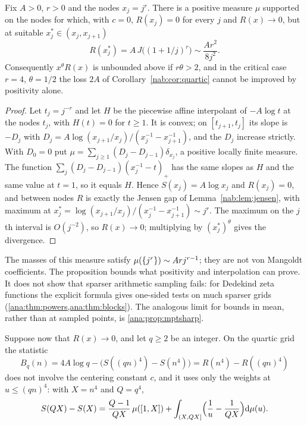 \begin{proposition}\label{nab:prop:samplingsharp}
Fix $A>0$, $r>0$ and the nodes $x_j=j^r$. There is a positive measure $\mu$ supported on
the nodes for which, with $c=0$, $R(x_j)=0$ for every $j$ and $R(x)\to0$, but at suitable
$x_j^*\in(x_j,x_{j+1})$
\[
 R(x_j^*)=A\,J\bigl((1+1/j)^r\bigr)\sim\frac{Ar^2}{8j^2}.
\]
Consequently $x^\theta R(x)$ is unbounded above if $r\theta>2$, and in the critical case
$r=4$, $\theta=1/2$ the loss $2A$ of Corollary~\ref{nab:cor:quartic} cannot be improved by
positivity alone.
\end{proposition}
\begin{proof}
Let $t_j=j^{-r}$ and let $H$ be the piecewise affine interpolant of $-A\log t$ at the nodes
$t_j$, with $H(t)=0$ for $t\ge1$. It is convex; on $[t_{j+1},t_j]$ its slope is $-D_j$ with
$D_j=A\log(x_{j+1}/x_j)/(x_j^{-1}-x_{j+1}^{-1})$, and the $D_j$ increase strictly. With
$D_0=0$ put $\mu=\sum_{j\ge1}(D_j-D_{j-1})\delta_{x_j}$, a positive locally finite measure.
The function $\sum_j(D_j-D_{j-1})(x_j^{-1}-t)_+$ has the same slopes as $H$ and the same
value at $t=1$, so it equals $H$. Hence $S(x_j)=A\log x_j$ and $R(x_j)=0$, and between
nodes $R$ is exactly the Jensen gap of Lemma~\ref{nab:lem:jensen}, with maximum at
$x_j^*=\log(x_{j+1}/x_j)/(x_j^{-1}-x_{j+1}^{-1})\sim j^r$. The maximum on the $j$th interval
is $O(j^{-2})$, so $R(x)\to0$; multiplying by $(x_j^*)^\theta$ gives the divergence.
\end{proof}

The masses of this measure satisfy $\mu(\{j^r\})\sim Arj^{r-1}$; they are not von
Mangoldt coefficients. The proposition bounds what positivity and interpolation can prove.
It does not show that sparser arithmetic sampling fails: for Dedekind zeta functions the
explicit formula gives one-sided tests on much sparser grids
(\cref{ana:thm:powers,ana:thm:blocks}). The analogous limit for bounds in mean, rather than
at sampled points, is \cref{ana:prop:mptsharp}.

Suppose now that $R(x)\to0$, and let $q\ge2$ be an integer. On the quartic grid the
statistic
\begin{equation}\label{nab:eq:B}
 B_q(n)=4A\log q-\bigl(S((qn)^4)-S(n^4)\bigr)=R(n^4)-R((qn)^4)
\end{equation}
does not involve the centering constant $c$, and it uses only the weights at $u\le(qn)^4$:
with $X=n^4$ and $Q=q^4$,
\[
 S(QX)-S(X)=\frac{Q-1}{QX}\,\mu([1,X])+\int_{(X,QX]}\Bigl(\frac1u-\frac1{QX}\Bigr)\mathrm{d}\mu(u).
\]

